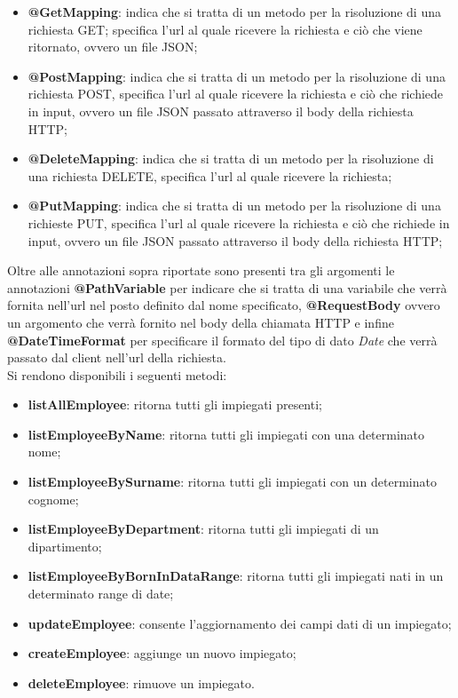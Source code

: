 \begin{itemize}
  \item \textbf{@GetMapping}: indica che si tratta di un metodo per la risoluzione di una richiesta GET; specifica l'url al quale ricevere la richiesta e ciò che viene ritornato, ovvero un file JSON;
  \item \textbf{@PostMapping}: indica che si tratta di un metodo per la risoluzione di una richiesta POST, specifica l'url al quale ricevere la richiesta e ciò che richiede in input, ovvero un file JSON passato attraverso il body della richiesta HTTP;
  \item  \textbf{@DeleteMapping}: indica che si tratta di un metodo per la risoluzione di una richiesta DELETE, specifica l'url al quale ricevere la richiesta;
  \item \textbf{@PutMapping}: indica che si tratta di un metodo per la risoluzione di una richieste PUT, specifica l'url al quale ricevere la richiesta e ciò che richiede in input, ovvero un file JSON passato attraverso il body della richiesta HTTP;
\end{itemize}
Oltre alle annotazioni sopra riportate sono presenti tra gli argomenti le annotazioni \textbf{@PathVariable} per indicare che si tratta di una variabile che verrà fornita nell'url nel posto definito dal nome specificato, \textbf{@RequestBody} ovvero un argomento che verrà fornito nel body della chiamata HTTP e infine \textbf{@DateTimeFormat} per specificare il formato del tipo di dato \textit{Date} che verrà passato dal client nell'url della richiesta.\\
Si rendono disponibili i seguenti metodi:
\begin{itemize}
  \item \textbf{listAllEmployee}: ritorna tutti gli impiegati presenti;
  \item \textbf{listEmployeeByName}: ritorna tutti gli impiegati con una determinato nome;
  \item \textbf{listEmployeeBySurname}: ritorna tutti gli impiegati con un determinato cognome;
  \item \textbf{listEmployeeByDepartment}: ritorna tutti gli impiegati di un dipartimento;
  \item \textbf{listEmployeeByBornInDataRange}: ritorna tutti gli impiegati nati in un determinato range di date;
  \item \textbf{updateEmployee}: consente l'aggiornamento dei campi dati di un impiegato;
  \item \textbf{createEmployee}: aggiunge un nuovo impiegato;
  \item \textbf{deleteEmployee}: rimuove un impiegato.
\end{itemize}
